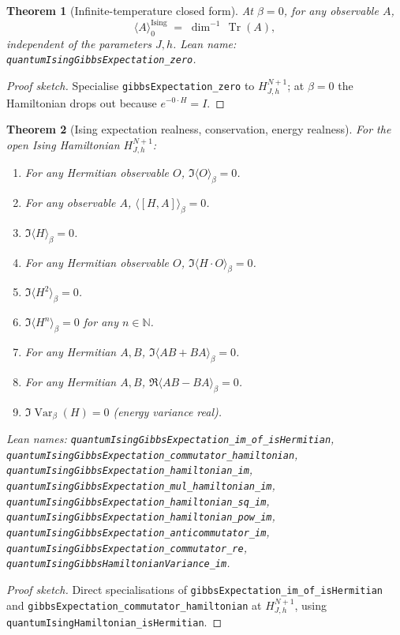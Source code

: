 \documentclass[a4paper,11pt]{article}
\newtheorem{theorem}{Theorem}
\begin{document}
\begin{theorem}[Infinite-temperature closed form]
At $\beta = 0$, for any observable $A$,
\[
  \langle A \rangle_0^{\mathrm{Ising}}
  \;=\; \dim^{-1}\,\operatorname{Tr}(A),
\]
independent of the parameters $J, h$. Lean name:
\texttt{quantumIsingGibbsExpectation\_zero}.
\end{theorem}

\begin{proof}[Proof sketch]
Specialise \texttt{gibbsExpectation\_zero} to $H_{J,h}^{N+1}$; at
$\beta = 0$ the Hamiltonian drops out because $e^{-0\cdot H} = I$.
\end{proof}

\begin{theorem}[Ising expectation realness, conservation, energy realness]
For the open Ising Hamiltonian $H_{J,h}^{N+1}$:
\begin{enumerate}
  \item For any Hermitian observable $O$,
    $\Im\langle O \rangle_\beta = 0$.
  \item For any observable $A$, $\langle [H, A] \rangle_\beta = 0$.
  \item $\Im\langle H \rangle_\beta = 0$.
  \item For any Hermitian observable $O$,
    $\Im\langle H \cdot O \rangle_\beta = 0$.
  \item $\Im\langle H^2 \rangle_\beta = 0$.
  \item $\Im\langle H^n \rangle_\beta = 0$ for any $n \in \mathbb{N}$.
  \item For any Hermitian $A, B$,
    $\Im\langle A B + B A \rangle_\beta = 0$.
  \item For any Hermitian $A, B$,
    $\Re\langle A B - B A \rangle_\beta = 0$.
  \item $\Im\operatorname{Var}_\beta(H) = 0$ (energy variance real).
\end{enumerate}
Lean names:
\texttt{quantumIsingGibbsExpectation\_im\_of\_isHermitian},
\texttt{quantumIsingGibbsExpectation\_commutator\_hamiltonian},
\texttt{quantumIsingGibbsExpectation\_hamiltonian\_im},
\texttt{quantumIsingGibbsExpectation\_mul\_hamiltonian\_im},
\texttt{quantumIsingGibbsExpectation\_hamiltonian\_sq\_im},
\texttt{quantumIsingGibbsExpectation\_hamiltonian\_pow\_im},
\texttt{quantumIsingGibbsExpectation\_anticommutator\_im},
\texttt{quantumIsingGibbsExpectation\_commutator\_re},
\texttt{quantumIsingGibbsHamiltonianVariance\_im}.
\end{theorem}

\begin{proof}[Proof sketch]
Direct specialisations of
\texttt{gibbsExpectation\_im\_of\_isHermitian} and
\texttt{gibbsExpectation\_commutator\_hamiltonian} at $H_{J,h}^{N+1}$,
using \texttt{quantumIsingHamiltonian\_isHermitian}.
\end{proof}
\end{document}

